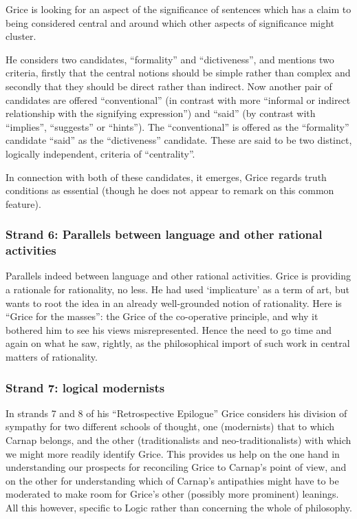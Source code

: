 \documentclass[10pt,titlepage]{book}
\begin{document}
Grice is looking for an aspect of the significance of sentences which has a claim to being considered central and around which other aspects of significance might cluster.

He considers two candidates, ``formality'' and ``dictiveness'', and mentions two criteria, firstly that the central notions should be simple rather than complex and secondly that they should be direct rather than indirect. Now another pair of candidates are offered ``conventional'' (in contrast with more ``informal or indirect relationship with the signifying expression'') and ``said'' (by contrast with ``implies'', ``suggests'' or ``hints''). The ``conventional'' is offered as the ``formality'' candidate ``said'' as the ``dictiveness'' candidate. These are said to be two distinct, logically independent, criteria of ``centrality''.

In connection with both of these candidates, it emerges, Grice regards truth conditions as essential (though he does not appear to remark on this common feature). 

\subsubsection{Strand 6: Parallels between language and other rational activities}

Parallels indeed between language and other rational activities.
Grice is providing a rationale for rationality, no less. He had used `implicature' as 
a  term of art, but wants to root the idea in an already well-grounded 
notion of  rationality. Here is ``Grice for the masses'': the Grice of the 
co-operative  principle, and why it bothered him to see his views misrepresented. 
Hence the  need to go time and again on what he saw, rightly, as the 
philosophical import  of such work in central matters of rationality.

\subsubsection{Strand 7: logical modernists}

In strands 7 and 8 of his ``Retrospective Epilogue'' Grice considers his division of sympathy for two different schools of thought, one (modernists) that to which Carnap belongs, and the other (traditionalists and neo-traditionalists) with which we might more readily identify Grice.
This provides us help on the one hand in understanding our prospects for reconciling Grice to Carnap's point of view, and on the other for understanding which of Carnap's antipathies might have to be moderated to make room for Grice's other (possibly more prominent) leanings.
All this however, specific to Logic rather than concerning the whole of philosophy.
\end{document}
